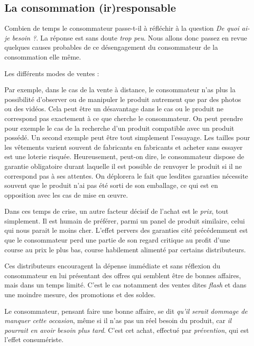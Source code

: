 \subsection{La consommation (ir)responsable}

Combien de temps le consommateur passe-t-il à réfléchir à la question \textit{De quoi ai-je besoin ?}.
La réponse est sans doute \textit{trop peu}. Nous allons donc passez en revue quelques causes probables de ce désengagement du consommateur de la consommation elle même.

\medbreak
Les différents modes de ventes  : 

Par exemple, dans le cas de la vente à distance, le consommateur n'as plus la possibilité d'observer ou de manipuler le produit autrement que par des photos ou des vidéos.
Cela peut être un désavantage dans le cas ou le produit ne correspond pas exactement à ce que cherche le consommateur.
\medbreak
On peut prendre pour exemple le cas de la recherche d'un produit compatible avec un produit possédé.
Un second exemple peut être tout simplement l'essayage. Les tailles pour les vêtements varient souvent de fabricants en fabricants et acheter sans essayer est une loterie risquée.
\smallbreak
Heureusement, peut-on dire, le consommateur dispose de garantie obligatoire durant laquelle il est possible de renvoyer le produit si il ne correspond pas à ses attentes. On déplorera le fait que lesdites garanties nécessite souvent que le produit n'ai pas été sorti de son emballage, ce qui est en opposition avec les cas de mise en œuvre.

\medbreak
Dans ces temps de crise, un autre facteur décisif de l'achat est le \textit{prix}, tout simplement.
Il est humain de préférer, parmi un panel de produit similaire, celui qui nous parait le moins cher.
L'effet pervers des garanties cité précédemment est que le consommateur perd une partie de son regard critique au profit d'une course au prix le plus bas, course habilement alimenté par certains distributeurs.

\smallbreak
Ces distributeurs encouragent la dépense immédiate et sans réflexion du consommateur en lui présentant des offres qui semblent être de bonnes affaires, mais dans un temps limité. C'est le cas notamment des ventes dites \textit{flash} et dans une moindre mesure, des promotions et des soldes.

\smallbreak
Le consommateur, pensant faire une bonne affaire, se dit \textit{qu'il serait dommage de manquer cette occasion}, même si il n'as pas un réel besoin du produit, car \textit{il pourrait en avoir besoin plus tard}. C'est cet achat, effectué par \textit{prévention}, qui est l'effet consumériste.

